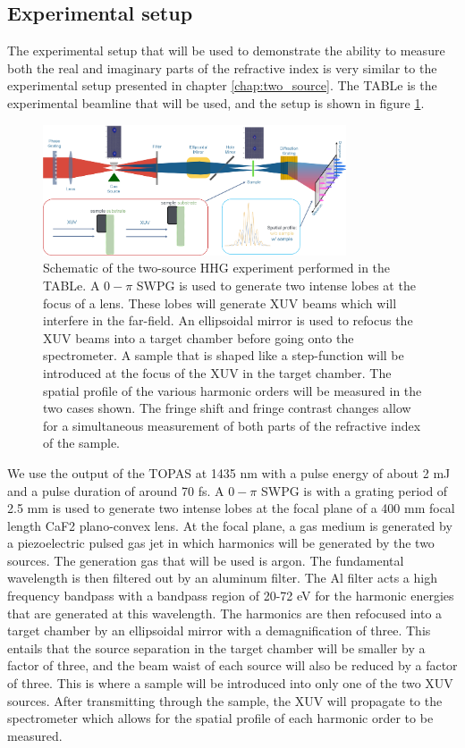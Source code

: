 \subsection{Experimental setup}
\label{sec:experimental_setup_refrac}
The experimental setup that will be used to demonstrate the ability to measure both the real and imaginary parts of the refractive index is very similar to the experimental setup presented in chapter \ref{chap:two_source}.  The TABLe is the experimental beamline that will be used, and the setup is shown in figure \ref{fig:refract_schematic}.
\begin{figure}
	\centering
	\includegraphics[width=0.8\textwidth]{figures/refractive_index/experimental_setup.png}
	\caption{Schematic of the two-source HHG experiment performed in the TABLe. A $0-\pi$ SWPG is used to generate two intense lobes at the focus of a lens.  These lobes will generate XUV beams which will interfere in the far-field.  An ellipsoidal mirror is used to refocus the XUV beams into a target chamber before going onto the spectrometer. A sample that is shaped like a step-function will be introduced at the focus of the XUV in the target chamber.  The spatial profile of the various harmonic orders will be measured in the two cases shown.  The fringe shift and fringe contrast changes allow for a simultaneous measurement of both parts of the refractive index of the sample.}
	\label{fig:refract_schematic}
\end{figure}
We use the output of the TOPAS at 1435 nm with a pulse energy of about 2 mJ and a pulse duration of around 70 fs. A $0-\pi$ SWPG is with a grating period of 2.5 mm is used to generate two intense lobes at the focal plane of a 400 mm focal length CaF2 plano-convex lens. At the focal plane, a gas medium is generated by a piezoelectric pulsed gas jet in which harmonics will be generated by the two sources.  The generation gas that will be used is argon. The fundamental wavelength is then filtered out by an aluminum filter.  The Al filter acts a high frequency bandpass with a bandpass region of 20-72 eV for the harmonic energies that are generated at this wavelength.  The harmonics are then refocused into a target chamber by an ellipsoidal mirror with a demagnification of three.  This entails that the source separation in the target chamber will be smaller by a factor of three, and the beam waist of each source will also be reduced by a factor of three.  This is where a sample will be introduced into only one of the two XUV sources.  After transmitting through the sample, the XUV will propagate to the spectrometer which allows for the spatial profile of each harmonic order to be measured.

